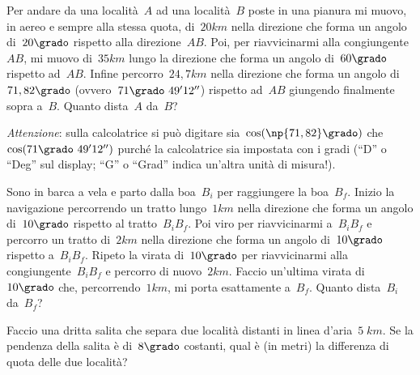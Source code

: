 \begin{multicols}{2}
\begin{esercizio}[\Ast]
\label{ese:G.43}
Per andare da una località~$A$ ad una località~$B$ poste in una pianura mi muovo, in aereo e sempre alla stessa quota, di~$20\unit{km}$
nella direzione che forma un angolo di~$20\grado$ rispetto alla direzione~$AB$. Poi, per riavvicinarmi alla congiungente~$AB$,
mi muovo di~$35\unit{km}$ lungo la direzione che forma un angolo di~$60\grado$ rispetto ad~$AB$. Infine percorro~$24,7\unit{km}$
nella direzione che forma un angolo di~$71,82\grado$ (ovvero~$71\grado~49' 12''$) rispetto ad~$AB$ giungendo finalmente sopra a~$B$.
Quanto dista~$A$ da~$B$?

\emph{Attenzione}: sulla calcolatrice si può digitare sia~$\cos(\np{71,82}\grado)$ che~$\cos(71\grado~49' 12'')$ purché la calcolatrice sia
impostata con i gradi (``D'' o ``Deg'' sul display; ``G'' o ``Grad'' indica un'altra unità di misura!).

\begin{center}
 
\end{center}
\end{esercizio}
\end{multicols}
\begin{esercizio}[\Ast]
\label{ese:G.44}
Sono in barca a vela e parto dalla boa~$B_i$ per raggiungere la boa~$B_f$. Inizio la navigazione percorrendo un tratto lungo~$1\unit{km}$
nella direzione che forma un angolo di~$10\grado$ rispetto al tratto~$B_i B_f$. Poi viro per riavvicinarmi a~$B_i B_f$ e percorro un tratto
di~$2\unit{km}$ nella direzione che forma un angolo di~$10\grado$ rispetto a~$B_i B_f$. Ripeto la virata di~$10\grado$ per
riavvicinarmi alla congiungente~$B_i B_f$ e percorro di nuovo~$2\unit{km}$. Faccio un'ultima virata di~$10\grado$ che, percorrendo~$1\unit{km}$,
mi porta esattamente a~$B_f$. Quanto dista~$B_i$ da~$B_f$?
\pagebreak
\begin{center}
 
\end{center}
\end{esercizio}

\begin{esercizio}[\Ast]
\label{ese:G.45}
Faccio una dritta salita che separa due località distanti in linea d'aria~$5\;\unit{km}$. Se la pendenza della salita è di~$8\grado$ costanti,
qual è (in metri) la differenza di quota delle due località?
\end{esercizio}


